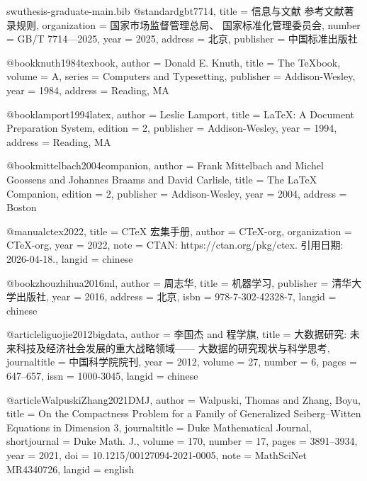 \begin{filecontents*}[overwrite]{swuthesis-graduate-main.bib}
@standard{gbt7714,
  title        = {信息与文献 参考文献著录规则},
  organization = {国家市场监督管理总局、
    国家标准化管理委员会},
  number       = {GB/T 7714---2025},
  year         = {2025},
  address      = {北京},
  publisher    = {中国标准出版社}
}

@book{knuth1984texbook,
  author    = {Donald E. Knuth},
  title     = {The {\TeX}book},
  volume    = {A},
  series    = {Computers and Typesetting},
  publisher = {Addison-Wesley},
  year      = {1984},
  address   = {Reading, MA}
}

@book{lamport1994latex,
  author    = {Leslie Lamport},
  title     = {{\LaTeX}: A Document Preparation System},
  edition   = {2},
  publisher = {Addison-Wesley},
  year      = {1994},
  address   = {Reading, MA}
}

@book{mittelbach2004companion,
  author    = {Frank Mittelbach and Michel Goossens and Johannes Braams
    and David Carlisle},
  title     = {The {\LaTeX} Companion},
  edition   = {2},
  publisher = {Addison-Wesley},
  year      = {2004},
  address   = {Boston}
}

@manual{ctex2022,
  title        = {{CTeX} 宏集手册},
  author       = {{CTeX-org}},
  organization = {CTeX-org},
  year         = {2022},
  note         = {CTAN: https://ctan.org/pkg/ctex. 引用日期: 2026-04-18.},
  langid       = {chinese}
}

@book{zhouzhihua2016ml,
  author    = {周志华},
  title     = {机器学习},
  publisher = {清华大学出版社},
  year      = {2016},
  address   = {北京},
  isbn      = {978-7-302-42328-7},
  langid    = {chinese}
}

@article{liguojie2012bigdata,
  author       = {李国杰 and 程学旗},
  title        = {大数据研究: 未来科技及经济社会发展的重大战略领域——
    大数据的研究现状与科学思考},
  journaltitle = {中国科学院院刊},
  year         = {2012},
  volume       = {27},
  number       = {6},
  pages        = {647--657},
  issn         = {1000-3045},
  langid       = {chinese}
}

@article{WalpuskiZhang2021DMJ,
  author       = {Walpuski, Thomas and Zhang, Boyu},
  title        = {On the Compactness Problem for a Family of Generalized
    {Seiberg--Witten} Equations in Dimension 3},
  journaltitle = {Duke Mathematical Journal},
  shortjournal = {Duke Math. J.},
  volume       = {170},
  number       = {17},
  pages        = {3891--3934},
  year         = {2021},
  doi          = {10.1215/00127094-2021-0005},
  note         = {MathSciNet MR4340726},
  langid       = {english}
}


\end{filecontents*}
